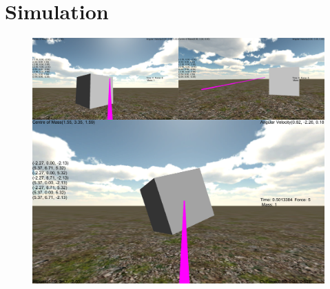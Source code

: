 \section{Simulation}
\begin{figure}[ht!]
	\label{fig:Simulation_of_Cloud_Dynamics_on_Graphics_Hardware_2}
	\centering
	\includegraphics[width=\textwidth]{images/Simulation.PNG}
\end{figure}
